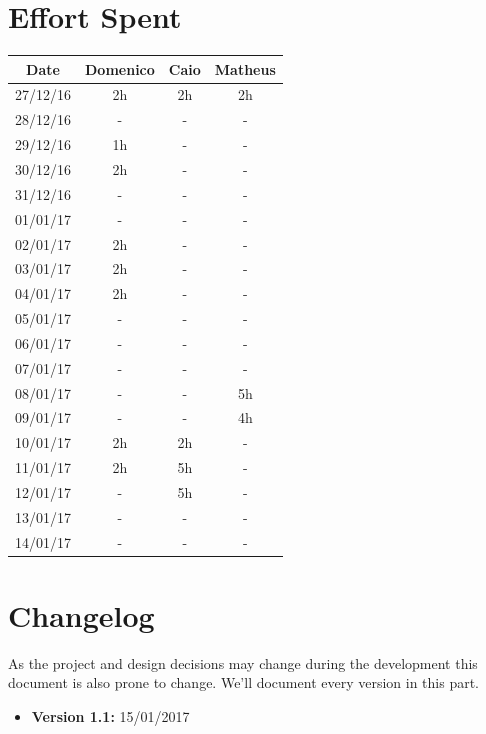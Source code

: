 \documentclass[a4paper]{article}
\begin{document}
\section{Effort Spent}
\begin{tabular}{ | c | c | c | c | }
\hline
	\textbf {Date} & \textbf {Domenico} & \textbf {Caio} & \textbf {Matheus} \\ \hline
	27/12/16& 2h & 2h & 2h  \\ \hline
	28/12/16& - & - & - \\ \hline
	29/12/16& 1h & - & - \\ \hline
	30/12/16& 2h & - & - \\ \hline
	31/12/16& - & - & - \\ \hline
	01/01/17& - & - & - \\ \hline
	02/01/17& 2h & - & - \\ \hline
	03/01/17& 2h & - & - \\ \hline
	04/01/17& 2h & - & - \\ \hline
	05/01/17& - & - & - \\ \hline
	06/01/17& - & - & - \\ \hline
	07/01/17& - & - & - \\ \hline
	08/01/17& - & - & 5h \\ \hline
	09/01/17& - & - & 4h \\ \hline
	10/01/17& 2h & 2h & - \\ \hline
	11/01/17& 2h & 5h & - \\ \hline
	12/01/17& - & 5h & - \\ \hline
	13/01/17& - & - & - \\ \hline
	14/01/17& - & - & - \\ \hline
\end{tabular}
\newpage

\section{Changelog}
As the project and design decisions may change during the development this document is also prone to change.
We'll document every version in this part.
\begin{itemize}
\item \textbf {Version 1.1:} 15/01/2017
\end{itemize}
\end{document}

